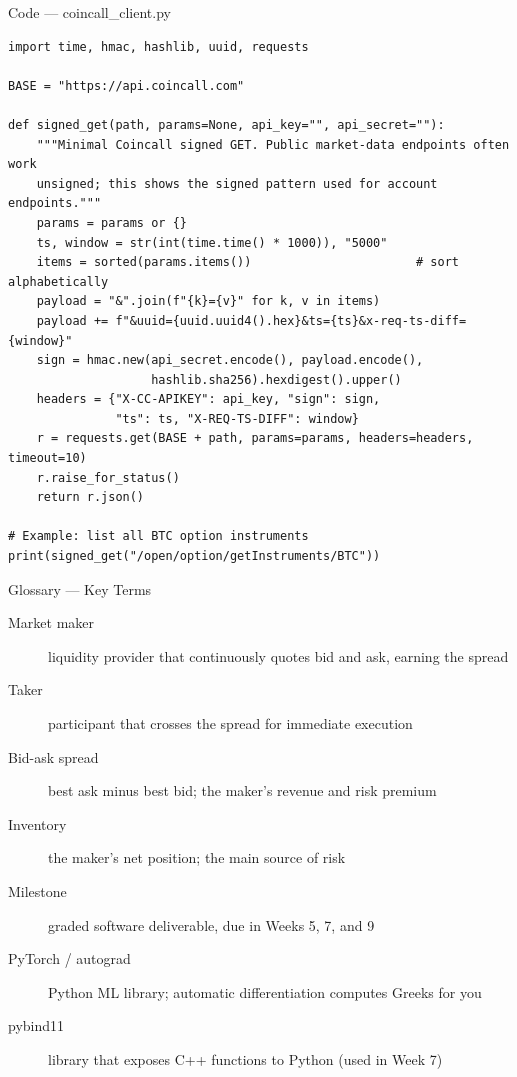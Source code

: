 \documentclass[aspectratio=169,10pt]{beamer}
\begin{document}
\begin{frame}[fragile]{Code --- coincall\_client.py}
\begin{lstlisting}
import time, hmac, hashlib, uuid, requests

BASE = "https://api.coincall.com"

def signed_get(path, params=None, api_key="", api_secret=""):
    """Minimal Coincall signed GET. Public market-data endpoints often work
    unsigned; this shows the signed pattern used for account endpoints."""
    params = params or {}
    ts, window = str(int(time.time() * 1000)), "5000"
    items = sorted(params.items())                       # sort alphabetically
    payload = "&".join(f"{k}={v}" for k, v in items)
    payload += f"&uuid={uuid.uuid4().hex}&ts={ts}&x-req-ts-diff={window}"
    sign = hmac.new(api_secret.encode(), payload.encode(),
                    hashlib.sha256).hexdigest().upper()
    headers = {"X-CC-APIKEY": api_key, "sign": sign,
               "ts": ts, "X-REQ-TS-DIFF": window}
    r = requests.get(BASE + path, params=params, headers=headers, timeout=10)
    r.raise_for_status()
    return r.json()

# Example: list all BTC option instruments
print(signed_get("/open/option/getInstruments/BTC"))
\end{lstlisting}
\end{frame}
\begin{frame}{Glossary --- Key Terms}
\footnotesize\begin{description}
\item[\color{ncsured}Market maker] liquidity provider that continuously quotes bid and ask, earning the spread
\item[\color{ncsured}Taker] participant that crosses the spread for immediate execution
\item[\color{ncsured}Bid-ask spread] best ask minus best bid; the maker's revenue and risk premium
\item[\color{ncsured}Inventory] the maker's net position; the main source of risk
\item[\color{ncsured}Milestone] graded software deliverable, due in Weeks 5, 7, and 9
\item[\color{ncsured}PyTorch / autograd] Python ML library; automatic differentiation computes Greeks for you
\item[\color{ncsured}pybind11] library that exposes C++ functions to Python (used in Week 7)
\end{description}
\end{frame}
\end{document}

